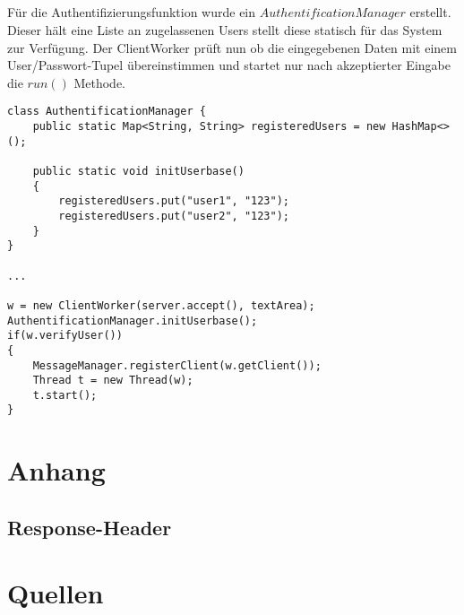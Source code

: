 \documentclass[12pt]{article}
\theoremstyle{plain}
\begin{document}
\subsection{}
Für die Authentifizierungsfunktion wurde ein $AuthentificationManager$ erstellt.
Dieser hält eine Liste an zugelassenen Users stellt diese statisch für das System zur Verfügung.
Der ClientWorker prüft nun ob die eingegebenen Daten mit einem User/Passwort-Tupel übereinstimmen und startet nur nach akzeptierter Eingabe die $run()$ Methode.
\begin{lstlisting}
class AuthentificationManager {
	public static Map<String, String> registeredUsers = new HashMap<>();

	public static void initUserbase()
	{
		registeredUsers.put("user1", "123");
		registeredUsers.put("user2", "123");
	}
}

...

w = new ClientWorker(server.accept(), textArea);
AuthentificationManager.initUserbase();
if(w.verifyUser())
{
	MessageManager.registerClient(w.getClient());
	Thread t = new Thread(w);
	t.start();
}
\end{lstlisting}
\subsection{}
\section{Anhang}
\subsection{Response-Header}
\section{Quellen}
\end{document}
